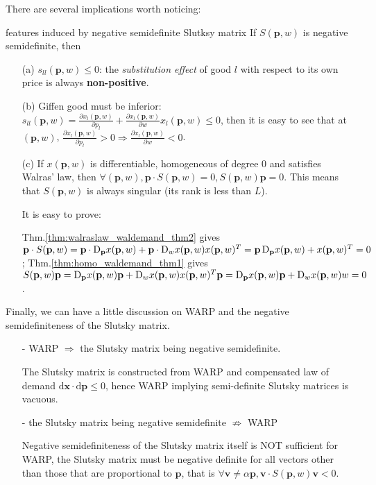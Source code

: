There are several implications worth noticing:
\begin{theorem}{features induced by negative semidefinite Slutksy matrix}{}
If $S(\mathbf{p},w)$ is negative semidefinite, then
    \begin{enumerate}
        \item[(a)] $s_{ll}(\mathbf{p},w)\leq 0$: the \textit{substitution effect} of good $l$ with respect to its own price is always \textbf{non-positive}.
        \item[(b)] Giffen good must be inferior: $s_{ll}(\mathbf{p},w)=\frac{\partial x_l(\mathbf{p},w)}{\partial p_l}+\frac{\partial x_l(\mathbf{p},w)}{\partial w}x_l(\mathbf{p},w)\leq 0$, then it is easy to see that at $(\mathbf{p},w)$, $\frac{\partial x_l(\mathbf{p},w)}{\partial p_l}>0\Rightarrow \frac{\partial x_l(\mathbf{p},w)}{\partial w}<0$.
        \item[(c)] If $ x(\mathbf{p},w)$ is differentiable, homogeneous of degree 0 and satisfies Walras' law, then $\forall (\mathbf{p},w), \mathbf{p}\cdot S(\mathbf{p},w)=0, S(\mathbf{p},w)\mathbf{p}=0$. This means that $S(\mathbf{p},w)$ is always singular (its rank is less than $L$).
        
        It is easy to prove:

        Thm.\ref{thm:walraslaw_waldemand_thm2} gives $\mathbf{p}\cdot S(\mathbf{p},w)=\mathbf{p}\cdot \mathop{}\!\mathrm{D}_{\mathbf{p}} x(\mathbf{p},w)+\mathbf{p}\cdot \mathop{}\!\mathrm{D}_w  x(\mathbf{p},w) x(\mathbf{p},w)^T =\mathbf{p}\mathop{}\!\mathrm{D}_{\mathbf{p}} x(\mathbf{p},w)+ x(\mathbf{p},w)^T=0$;
        Thm.\ref{thm:homo_waldemand_thm1} gives $S(\mathbf{p},w)\mathbf{p}=\mathop{}\!\mathrm{D}_{\mathbf{p}} x(\mathbf{p},w)\mathbf{p}+\mathop{}\!\mathrm{D}_w x(\mathbf{p},w) x(\mathbf{p},w)^T\mathbf{p}=\mathop{}\!\mathrm{D}_{\mathbf{p}} x(\mathbf{p},w)\mathbf{p}+\mathop{}\!\mathrm{D}_w x(\mathbf{p},w)w=0$.
    \end{enumerate}
\end{theorem}

Finally, we can have a little discussion on WARP and the negative semidefiniteness of the Slutsky matrix.

\begin{enumerate}
    \item[-] WARP $\Rightarrow$ the Slutsky matrix being negative semidefinite.
    
    The Slutsky matrix is constructed from WARP and compensated law of demand $\mathrm{d}\mathbf{x}\cdot \mathrm{d}\mathbf{p}\leq 0$, hence WARP implying semi-definite Slutsky matrices is vacuous.

    \item[-] the Slutsky matrix being negative semidefinite $\not\Rightarrow$ WARP
    
    Negative semidefiniteness of the Slutsky matrix itself is NOT sufficient for WARP, the Slutsky matrix must be negative definite for all vectors other than those that are proportional to $\mathbf{p}$, that is $\forall \mathbf{v}\neq \alpha \mathbf{p}, \mathbf{v}\cdot S(\mathbf{p},w)\mathbf{v}<0$.
    
\end{enumerate}

